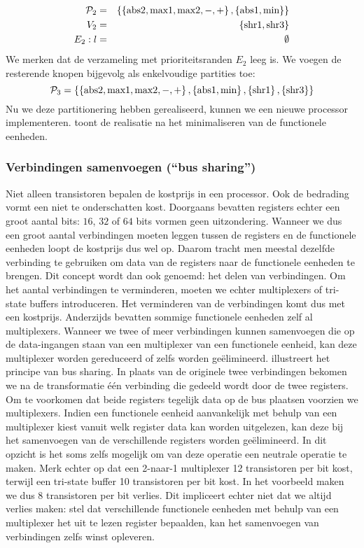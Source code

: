 \begin{eqnarray}
\mathcal{P}_2&=&\left\{ \left\{ \mbox{abs2},\mbox{max1},\mbox{max2},-,+ \right\},\left\{ \mbox{abs1},\mbox{min} \right\} \right\}\\
V_2&=&\left\{ \mbox{shr1},\mbox{shr3} \right\}\\
E_2:l&=&\emptyset
\end{eqnarray}
We merken dat de verzameling met prioriteitsranden $E_2$ leeg is. We voegen de resterende knopen bijgevolg als enkelvoudige partities toe:
\begin{equation}
\mathcal{P}_3=\left\{ \left\{ \mbox{abs2},\mbox{max1},\mbox{max2},-,+ \right\},\left\{ \mbox{abs1},\mbox{min} \right\},\left\{ \mbox{shr1} \right\},\left\{ \mbox{shr3} \right\} \right\}
\end{equation}
Nu we deze partitionering hebben gerealiseerd, kunnen we een nieuwe processor implementeren.  toont de realisatie na het minimaliseren van de functionele eenheden.
\subsubsection{Verbindingen samenvoegen (``bus sharing'')}
Niet alleen transistoren bepalen de kostprijs in een processor. Ook de bedrading vormt een niet te onderschatten kost. Doorgaans bevatten registers echter een groot aantal bits: $16$, $32$ of $64$ bits vormen geen uitzondering. Wanneer we dus een groot aantal verbindingen moeten leggen tussen de registers en de functionele eenheden loopt de kostprijs dus wel op. Daarom tracht men meestal dezelfde verbinding te gebruiken om data van de registers naar de functionele eenheden te brengen. Dit concept wordt dan ook  genoemd: het delen van verbindingen. Om het aantal verbindingen te verminderen, moeten we echter multiplexers of tri-state buffers introduceren. Het verminderen van de verbindingen komt dus met een kostprijs. Anderzijds bevatten sommige functionele eenheden zelf al multiplexers. Wanneer we twee of meer verbindingen kunnen samenvoegen die op de data-ingangen staan van een multiplexer van een functionele eenheid, kan deze multiplexer worden gereduceerd of zelfs worden ge\"elimineerd.
 illustreert het principe van bus sharing. In plaats van de originele twee verbindingen bekomen we na de transformatie \'e\'en verbinding die gedeeld wordt door de twee registers. Om te voorkomen dat beide registers tegelijk data op de bus plaatsen voorzien we multiplexers. Indien een functionele eenheid aanvankelijk met behulp van een multiplexer kiest vanuit welk register data kan worden uitgelezen, kan deze bij het samenvoegen van de verschillende registers worden ge\"elimineerd. In dit opzicht is het soms zelfs mogelijk om van deze operatie een neutrale operatie te maken. Merk echter op dat een 2-naar-1 multiplexer 12 transistoren per bit kost, terwijl een tri-state buffer 10 transistoren per bit kost. In het voorbeeld maken we dus 8 transistoren per bit verlies. Dit impliceert echter niet dat we altijd verlies maken: stel dat verschillende functionele eenheden met behulp van een multiplexer het uit te lezen register bepaalden, kan het samenvoegen van verbindingen zelfs winst opleveren.
